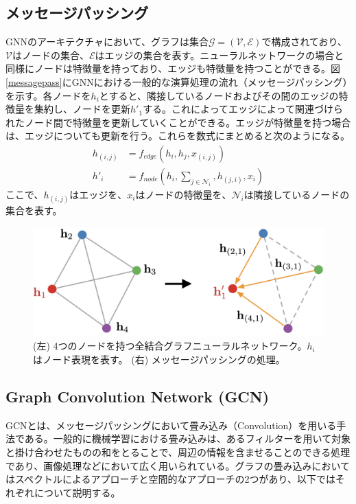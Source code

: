 \subsection{メッセージパッシング}
GNNのアーキテクチャにおいて、グラフは集合$\mathcal{G} = (\mathcal{V}, \mathcal{E})$で構成されており、$\mathcal{V}$はノードの集合、$\mathcal{E}$はエッジの集合を表す。ニューラルネットワークの場合と同様にノードは特徴量を持っており、エッジも特徴量を持つことができる。図\ref{messagepass}にGNNにおける一般的な演算処理の流れ（メッセージパッシング）を示す。各ノードを$h_i$とすると、隣接しているノードおよびその間のエッジの特徴量を集約し、ノードを更新$h'_1$する。これによってエッジによって関連づけられたノード間で特徴量を更新していくことができる。エッジが特徴量を持つ場合は、エッジについても更新を行う。これらを数式にまとめると次のようになる。
\begin{align}
h_{(i,j)} &= f_{edge}(h_i, h_j, x_{(i, j)})\\
h'_i &= f_{node}(h_i, \sum_{j\in \mathcal{N}_i}, h_{(j, i)}, x_i)
\end{align}
ここで、$h_{(i,j)}$はエッジを、$x_i$はノードの特徴量を、$\mathcal{N}_i$は隣接しているノードの集合を表す。
\begin{figure}[H]
	\begin{center}
 \includegraphics[keepaspectratio, scale=0.25]
 	{Figure/Deeplearning/messagepassing.png}
 		\caption{ (左) 4つのノードを持つ全結合グラフニューラルネットワーク。$h_i$はノード表現を表す。 (右) メッセージパッシングの処理。}
 		\label{messegepass}
	\end{center}
\end{figure}
\subsection{Graph Convolution Network (GCN)}
GCNとは、メッセージパッシングにおいて畳み込み（Convolution）を用いる手法である。一般的に機械学習における畳み込みは、あるフィルターを用いて対象と掛け合わせたものの和をとることで、周辺の情報を含ませることのできる処理であり、画像処理などにおいて広く用いられている。グラフの畳み込みにおいてはスペクトルによるアプローチと空間的なアプローチの2つがあり、以下ではそれぞれについて説明する。
